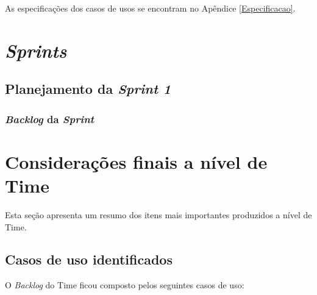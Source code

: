     As especificações dos casos de usos se encontram no Apêndice \ref{Especificacao}.
  
  \section{\textit{Sprints}}
    
    \subsection{Planejamento da \textit{Sprint 1}}
    
      \subsubsection{\textit{Backlog} da \textit{Sprint}}
     
  
  \section{Considerações finais a nível de Time}
    
    Esta seção apresenta um resumo dos itens mais importantes produzidos a nível de Time.
    
    \subsection{Casos de uso identificados} 
      
      O \textit{Backlog} do Time ficou composto pelos seguintes casos de uso:
      
      
